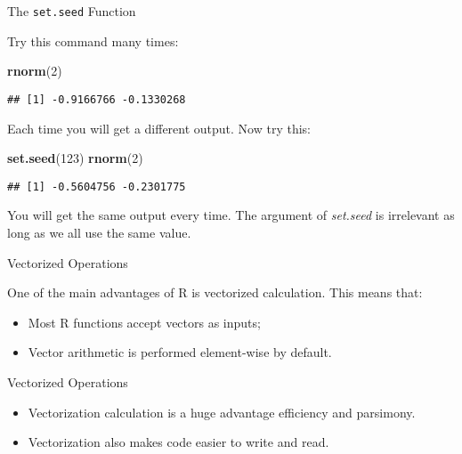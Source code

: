 \documentclass[ignorenonframetext,]{beamer}
\newenvironment{Shaded}{\begin{snugshade}}{\end{snugshade}}
\newcommand{\DecValTok}[1]{\textcolor[rgb]{0.00,0.00,0.81}{#1}}
\newcommand{\KeywordTok}[1]{\textcolor[rgb]{0.13,0.29,0.53}{\textbf{#1}}}
\newcommand{\NormalTok}[1]{#1}
\begin{document}
\begin{frame}[fragile]{The \texttt{set.seed} Function}
\protect\hypertarget{the-set.seed-function-1}{}

Try this command many times:

\begin{Shaded}
\begin{Highlighting}[]
\KeywordTok{rnorm}\NormalTok{(}\DecValTok{2}\NormalTok{) }
\end{Highlighting}
\end{Shaded}

\begin{verbatim}
## [1] -0.9166766 -0.1330268
\end{verbatim}

Each time you will get a different output. Now try this:

\begin{Shaded}
\begin{Highlighting}[]
\KeywordTok{set.seed}\NormalTok{(}\DecValTok{123}\NormalTok{)}
\KeywordTok{rnorm}\NormalTok{(}\DecValTok{2}\NormalTok{)}
\end{Highlighting}
\end{Shaded}

\begin{verbatim}
## [1] -0.5604756 -0.2301775
\end{verbatim}

You will get the same output every time. The argument of
\textit{set.seed} is irrelevant as long as we all use the same value.

\end{frame}

\begin{frame}{Vectorized Operations}
\protect\hypertarget{vectorized-operations}{}

One of the main advantages of R is vectorized calculation. This means
that:

\begin{itemize}
\item
  Most R functions accept vectors as inputs;
\item
  Vector arithmetic is performed element-wise by default.
\end{itemize}

\end{frame}

\begin{frame}{Vectorized Operations}
\protect\hypertarget{vectorized-operations-1}{}

\begin{itemize}
\item
  Vectorization calculation is a huge advantage efficiency and
  parsimony.
\item
  Vectorization also makes code easier to write and read.
\end{itemize}

\end{frame}
\end{document}
